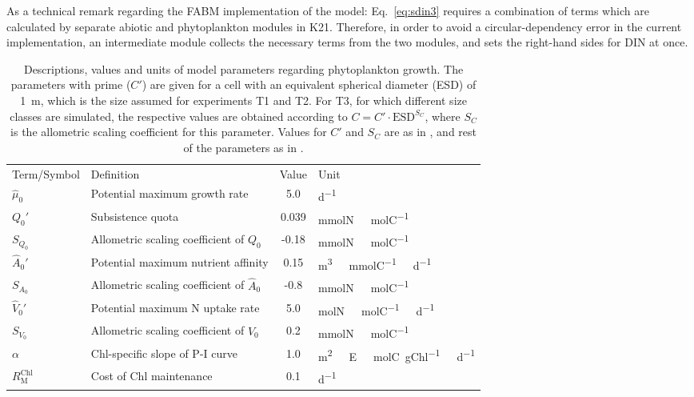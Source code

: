 \documentclass[gmd, manuscript]{copernicus}
\begin{document}
As a technical remark regarding the FABM implementation of the model: Eq.~\eqref{eq:sdin3} requires a combination of terms which are calculated by separate abiotic and phytoplankton modules in K21.  Therefore, in order to avoid a circular-dependency error in the current implementation, an intermediate module collects the necessary terms from the two modules, and sets the right-hand sides for DIN at once.

\begin{table*}[htb]
  \caption{ Descriptions, values and units of model parameters regarding phytoplankton growth. The parameters with prime ($C'$) are given for a cell with an equivalent spherical diameter (ESD) of 1\unit{{\mu}m}, which is the size assumed for experiments T1 and T2. For T3, for which different size classes are simulated, the respective values are obtained according to $C=C'\cdot \text{ESD}^{S_C}$, where $S_C$ is the allometric scaling coefficient for this parameter. Values for $C'$ and $S_C$ are as in \citet{Smith2016}, and rest of the parameters as in \citet{Kerimoglu2021}.\label{T.pars}}
  \begin{tabular}{l l c l}
    \tophline
    Term/Symbol         & Definition                        & Value     & Unit\\
    \middlehline
    $\hat{\mu}_0$   & Potential maximum growth rate         & 5.0       & \unit{d^{-1}}\\
    $Q_0'$  & Subsistence quota                     & 0.039     & \unit{mmolN\ molC^{-1}}\\
    $S_{Q_0}$  & Allometric scaling coefficient of $Q_0$       & -0.18     & \unit{mmolN\ molC^{-1}}\\
    $\hat{A}_0'$     & Potential maximum nutrient affinity   & 0.15       & \unit{m^3\ mmolC^{-1}\ d^{-1}}\\
    $S_{A_0}$  & Allometric scaling coefficient of $\hat{A}_0$        & -0.8     & \unit{mmolN\ molC^{-1}}\\
    $\hat{V}_0'$     & Potential maximum N uptake rate       & 5.0       & \unit{molN\ molC^{-1}\ d^{-1}}\\
    $S_{V_0}$  & Allometric scaling coefficient of $\hat{V}_0$        & 0.2     & \unit{mmolN\ molC^{-1}}\\
    $\alpha$           & Chl-specific slope of P-I curve    & 1.0       & \unit{m^2\ E\ molC gChl^{-1}\ d^{-1}}\\
    $R^{\text{Chl}}_{\text{M}}$     & Cost of Chl maintenance   & 0.1       & \unit{d^{-1}}\\

\end{tabular}
\end{table*}
\end{document}
